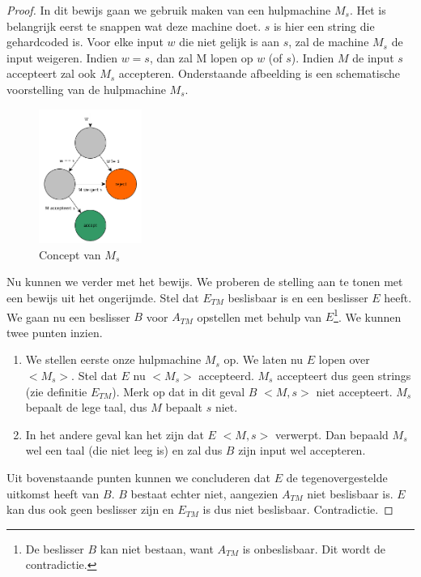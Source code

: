 \begin{proof}
	In dit bewijs gaan we gebruik maken van een hulpmachine $M_s$. Het is belangrijk eerst te snappen wat deze machine doet. $s$ is hier een string die gehardcoded is. Voor elke input $w$ die niet gelijk is aan $s$, zal de machine $M_s$ de input weigeren. Indien $w = s$, dan zal M lopen op $w$ (of $s$). Indien $M$ de input $s$ accepteert zal ook $M_s$ accepteren. Onderstaande afbeelding is een schematische voorstelling van de hulpmachine $M_s$.
	\begin{figure}[H]
  	\centering
    	  \includegraphics[width=0.3\textwidth]{./img/Ms}
  	\caption{Concept van $M_s$}
	\end{figure}
	Nu kunnen we verder met het bewijs. We proberen de stelling aan te tonen met een bewijs uit het ongerijmde. Stel dat $E_{TM}$ beslisbaar is en een beslisser $E$ heeft. We gaan nu een beslisser $B$ voor $A_{TM}$ opstellen met behulp van $E$\footnote{De beslisser $B$ kan niet bestaan, want $A_{TM}$ is onbeslisbaar. Dit wordt de contradictie.}. We kunnen twee punten inzien.
	\begin{enumerate}
		\item We stellen eerste onze hulpmachine $M_s$ op. We laten nu $E$ lopen over $<M_s>$. Stel dat $E$ nu $<M_s>$ accepteerd. $M_s$ accepteert dus geen strings (zie definitie $E_{TM}$). Merk op dat in dit geval $B$ $<M,s>$ niet accepteert. $M_s$ bepaalt de lege taal, dus $M$ bepaalt $s$ niet.
		\item In het andere geval kan het zijn dat $E$ $<M,s>$ verwerpt. Dan bepaald $M_s$ wel een taal (die niet leeg is) en zal dus $B$ zijn input wel accepteren.
	\end{enumerate}
	Uit bovenstaande punten kunnen we concluderen dat $E$ de tegenovergestelde uitkomst heeft van $B$. $B$ bestaat echter niet, aangezien $A_{TM}$ niet beslisbaar is. $E$ kan dus ook geen beslisser zijn en $E_{TM}$ is dus niet beslisbaar. Contradictie.
\end{proof}

